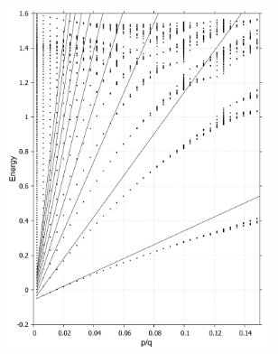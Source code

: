 \documentclass{report}
\begin{document}
\begin{figure}[htb]
	\centering
	\begin{subfigure}[b]{0.495\textwidth}
		\centering
		\includegraphics[width=0.85\textwidth,height=1.2\linewidth]{pic/landaulevel_h0_q_452.pdf}
		\label{fig:3 landau level 1}
	\end{subfigure}
	\begin{subfigure}[b]{0.495\textwidth}
		\centering

\end{subfigure}
\end{figure}
\end{document}
